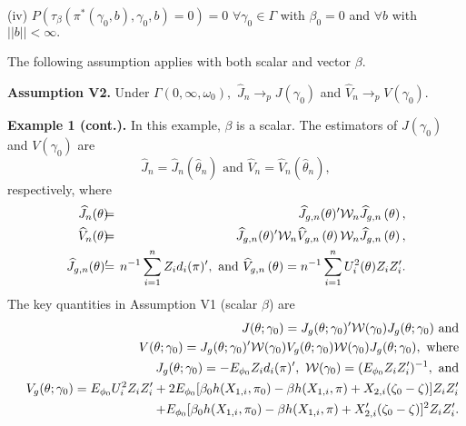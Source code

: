 \documentclass[12pt,titlepage,final,oneside,letterpaper]{article}
\begin{document}
\noindent (iv) $P(\tau _{\beta }(\pi ^{\ast }(\gamma _{0},b),\gamma
_{0},b)=0)=0$ $\forall \gamma _{0}\in \Gamma $ with $\beta _{0}=0$ and $%
\forall b$ with $||b||<\infty .$\medskip

The following assumption applies with both scalar and vector $\beta .$%
\medskip

\noindent \textbf{Assumption V2. }Under $\Gamma (0,\infty ,\omega _{0}),$ $%
\widehat{J}_{n}\rightarrow _{p}J(\gamma _{0})$ and $\widehat{V}%
_{n}\rightarrow _{p}V(\gamma _{0}).$\medskip

\noindent \textbf{Example 1 (cont.). }In this example, $\beta $ is a scalar.
The estimators of $J(\gamma _{0})$ and $V(\gamma _{0})$ are%
\begin{equation}
\widehat{J}_{n}=\widehat{J}_{n}(\widehat{\theta }_{n})\text{ and }\widehat{V}%
_{n}=\widehat{V}_{n}(\widehat{\theta }_{n}),
\end{equation}%
respectively, where%
\begin{eqnarray}
\widehat{J}_{n}(\theta )\hspace{-0.08in} &=&\hspace{-0.08in}\widehat{J}%
_{g,n}(\theta )^{\prime }\mathcal{W}_{n}\widehat{J}_{g,n}\left( \theta
\right) ,  \notag \\
\widehat{V}_{n}(\theta )\hspace{-0.08in} &=&\hspace{-0.08in}\widehat{J}%
_{g,n}(\theta )^{\prime }\mathcal{W}_{n}\widehat{V}_{g,n}\left( \theta
\right) \mathcal{W}_{n}\widehat{J}_{g,n}\left( \theta \right) ,  \notag \\
\widehat{J}_{g,n}(\theta )^{\prime }\hspace{-0.08in} &=&\hspace{-0.08in}%
n^{-1}\sum_{i=1}^{n}Z_{i}d_{i}(\pi )^{\prime },\text{ and }\widehat{V}%
_{g,n}\left( \theta \right) =n^{-1}\sum_{i=1}^{n}U_{i}^{2}(\theta
)Z_{i}Z_{i}^{\prime }.
\end{eqnarray}%
The key quantities in Assumption V1 (scalar $\beta $) are 
\begin{eqnarray}
&&J(\theta ;\gamma _{0})\overset{}{=}J_{g}(\theta ;\gamma _{0})^{\prime }%
\mathcal{W}(\gamma _{0})J_{g}(\theta ;\gamma _{0})\text{ and}  \notag \\
&&V(\theta ;\gamma _{0})\overset{}{=}J_{g}(\theta ;\gamma _{0})^{\prime }%
\mathcal{W}(\gamma _{0})V_{g}(\theta ;\gamma _{0})\mathcal{W}(\gamma
_{0})J_{g}(\theta ;\gamma _{0}),\text{ where}  \notag \\
&&J_{g}(\theta ;\gamma _{0})\overset{}{=}-E_{\phi _{0}}Z_{i}d_{i}(\pi
)^{\prime },\text{ }\mathcal{W}(\gamma _{0})\overset{}{=}(E_{\phi
_{0}}Z_{i}Z_{i}^{\prime })^{-1},\text{ and}  \label{gmm J and V} \\
&&V_{g}(\theta ;\gamma _{0})\overset{}{=}E_{\phi
_{0}}U_{i}^{2}Z_{i}Z_{i}^{\prime }+2E_{\phi _{0}}[\beta _{0}h(X_{1,i},\pi
_{0})-\beta h(X_{1,i},\pi )+X_{2,i}(\zeta _{0}-\zeta )]Z_{i}Z_{i}^{\prime } 
\notag \\
&&\hspace{0.78in}+E_{\phi _{0}}[\beta _{0}h(X_{1,i},\pi _{0})-\beta
h(X_{1,i},\pi )+X_{2,i}^{\prime }(\zeta _{0}-\zeta )]^{2}Z_{i}Z_{i}^{\prime
}.  \notag
\end{eqnarray}
\end{document}
